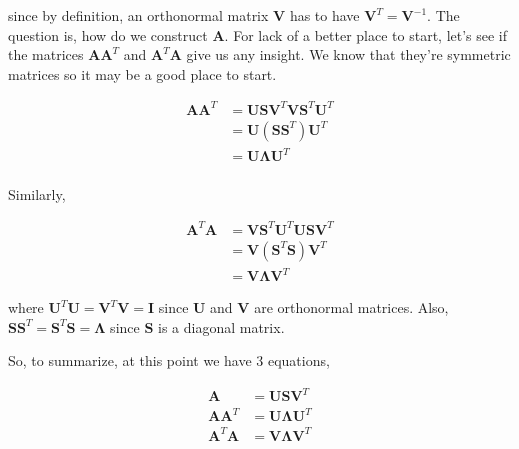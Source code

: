 since by definition, an orthonormal matrix $\mathbf{V}$ has to have $\mathbf{V}^T = \mathbf{V}^{-1}$.  The question is, how do we construct $\mathbf{A}$.  For lack of a better place to start, let's see if the matrices $\mathbf{A}\mathbf{A}^T$ and $\mathbf{A}^T\mathbf{A}$ give us any insight.  We know that they're symmetric matrices so it may be a good place to start.


\begin{equation}
\begin{array}{llll}
\mathbf{A}\mathbf{A}^T&= \mathbf{U} \mathbf{S} \mathbf{V}^T \mathbf{V} \mathbf{S}^T \mathbf{U}^T\\
&=\mathbf{U} (\mathbf{S} \mathbf{S}^T) \mathbf{U}^T\\ 
&=\mathbf{U}\boldsymbol\Lambda \mathbf{U}^T\\ 
\end{array}
\label{Eq:first}
\end{equation}

Similarly,

\begin{equation}
\begin{array}{llll}
\mathbf{A}^T\mathbf{A}&=\mathbf{V} \mathbf{S}^T \mathbf{U}^T \mathbf{U} \mathbf{S} \mathbf{V}^T\\
&=\mathbf{V} (\mathbf{S}^T \mathbf{S}) \mathbf{V}^T\\
&=\mathbf{V} \boldsymbol\Lambda \mathbf{V}^T
\end{array}
\label{Eq:second}
\end{equation}

where $\mathbf{U}^T \mathbf{U} =\mathbf{V}^T \mathbf{V} = \mathbf{I}$ since $\mathbf{U}$ and $\mathbf{V}$ are orthonormal matrices.  Also, $\mathbf{S} \mathbf{S}^T = \mathbf{S}^T \mathbf{S}=\boldsymbol\Lambda$ since $\mathbf{S}$ is a diagonal matrix.  

So, to summarize, at this point we have 3 equations,

\begin{equation}
\boxed{
\begin{array}{llll}
\mathbf{A} &=\mathbf{U} \mathbf{S} \mathbf{V}^T\\
\mathbf{A}\mathbf{A}^T&=\mathbf{U}\boldsymbol\Lambda \mathbf{U}^T\\
\mathbf{A}^T\mathbf{A}&=\mathbf{V}\boldsymbol\Lambda \mathbf{V}^T\\
\end{array}}
\label{Eq:summary}
\end{equation}

